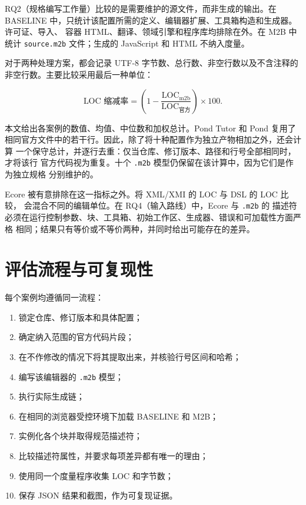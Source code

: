 RQ2（规格编写工作量）比较的是需要维护的源文件，而非生成的输出。在 BASELINE
中，只统计该配置所需的定义、编辑器扩展、工具箱构造和生成器。许可证、导入、
容器 HTML、翻译、领域引擎和程序库均排除在外。在 M2B 中统计
\texttt{source.m2b} 文件；生成的 JavaScript 和 HTML 不纳入度量。

对于两种处理方案，都会记录 UTF-8 字节数、总行数、非空行数以及不含注释的
非空行数。主要比较采用最后一种单位：

\begin{equation}
  \text{LOC 缩减率} =
  \left(1 - \frac{\text{LOC}_{\mathrm{m2b}}}
                    {\text{LOC}_{\text{官方}}}\right) \times 100.
  \label{eq:reduccion-loc}
\end{equation}

本文给出各案例的数值、均值、中位数和加权总计。Pond Tutor 和 Pond 复用了
相同官方文件中的若干行。因此，除了将十种配置作为独立产物相加之外，还会计算
一个保守总计，并逐行去重：仅当仓库、修订版本、路径和行号全部相同时，才将该行
官方代码视为重复。十个 \texttt{.m2b} 模型仍保留在该计算中，因为它们是作为独立规格
分别维护的。

Ecore 被有意排除在这一指标之外。将 XML/XMI 的 LOC 与 DSL 的 LOC 比较，
会混合不同的编辑单位。在 RQ4（输入路线）中，Ecore 与 \texttt{.m2b} 的
描述符必须在运行控制参数、块、工具箱、初始工作区、生成器、错误和可加载性方面严格
相同；结果只有等价或不等价两种，并同时给出可能存在的差异。

\section{评估流程与可复现性}
\label{sec:procedimiento-evaluacion-blockly}

每个案例均遵循同一流程：

\begin{enumerate}
  \item 锁定仓库、修订版本和具体配置；
  \item 确定纳入范围的官方代码片段；
  \item 在不作修改的情况下将其提取出来，并核验行号区间和哈希；
  \item 编写该编辑器的 \texttt{.m2b} 模型；
  \item 执行实际生成链；
  \item 在相同的浏览器受控环境下加载 BASELINE 和 M2B；
  \item 实例化各个块并取得规范描述符；
  \item 比较描述符属性，并要求每项差异都有唯一的理由；
  \item 使用同一个度量程序收集 LOC 和字节数；
  \item 保存 JSON 结果和截图，作为可复现证据。
\end{enumerate}

